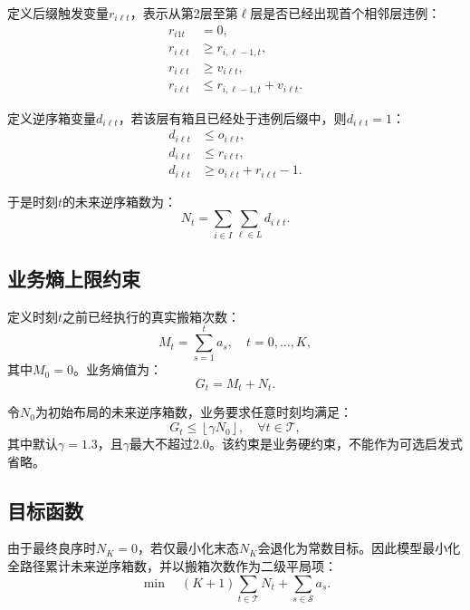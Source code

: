 \documentclass[11pt,a4paper]{ctexart}
\begin{document}
定义后缀触发变量$r_{i\ell t}$，表示从第2层至第$\ell$层是否已经出现首个相邻层违例：
\begin{align}
r_{i1t} &=0,\\
r_{i\ell t} &\ge r_{i,\ell-1,t},\\
r_{i\ell t} &\ge v_{i\ell t},\\
r_{i\ell t} &\le r_{i,\ell-1,t}+v_{i\ell t}.
\end{align}

定义逆序箱变量$d_{i\ell t}$，若该层有箱且已经处于违例后缀中，则$d_{i\ell t}=1$：
\begin{align}
d_{i\ell t} &\le o_{i\ell t},\\
d_{i\ell t} &\le r_{i\ell t},\\
d_{i\ell t} &\ge o_{i\ell t}+r_{i\ell t}-1.
\end{align}

于是时刻$t$的未来逆序箱数为：
\begin{equation}
N_t=\sum_{i\in I}\sum_{\ell\in L}d_{i\ell t}.
\end{equation}

\subsection{业务熵上限约束}
定义时刻$t$之前已经执行的真实搬箱次数：
\begin{equation}
M_t=\sum_{s=1}^{t} a_s,\quad t=0,\ldots,K,
\end{equation}
其中$M_0=0$。业务熵值为：
\begin{equation}
G_t=M_t+N_t.
\end{equation}

令$N_0$为初始布局的未来逆序箱数，业务要求任意时刻均满足：
\begin{equation}
G_t\le \left\lfloor \gamma N_0\right\rfloor,
\quad \forall t\in\mathcal{T},
\end{equation}
其中默认$\gamma=1.3$，且$\gamma$最大不超过2.0。该约束是业务硬约束，不能作为可选启发式省略。

\subsection{目标函数}
由于最终良序时$N_K=0$，若仅最小化末态$N_K$会退化为常数目标。因此模型最小化全路径累计未来逆序箱数，并以搬箱次数作为二级平局项：
\begin{equation}
\min \quad (K+1)\sum_{t\in\mathcal{T}}N_t+\sum_{s\in\mathcal{S}} a_s .
\end{equation}
\end{document}
